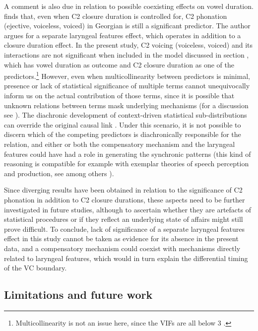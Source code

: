 \documentclass[charis]{glossa}
\begin{document}
A comment is also due in relation to possible coexisting effects on
vowel duration. \citet{begus2017} finds that, even when C2 closure
duration is controlled for, C2 phonation (ejective, voiceless, voiced)
in Georgian is still a significant predictor. The author argues for a
separate laryngeal features effect, which operates in addition to a
closure duration effect. In the present study, C2 voicing (voiceless,
voiced) and its interactions are not significant when included in the
model discussed in section , which has vowel duration
as outcome and C2 closure duration as one of the
predictors.\footnote{Multicollinearity is not an issue here, since the VIFs are all below 3 \citep{zuur2010}.}
However, even when multicollinearity between predictors is minimal,
presence or lack of statistical significance of multiple terms cannot
unequivocally inform us on the actual contribution of those terms, since
it is possible that unknown relations between terms mask underlying
mechanisms (for a discussion see \citealt{mcelreath2015}). The
diachronic development of context-driven statistical sub-distributions
can override the original causal link \citep{soskuthy2013}. Under this
scenario, it is not possible to discern which of the competing
predictors is diachronically responsible for the relation, and either or
both the compensatory mechanism and the laryngeal features could have
had a role in generating the synchronic patterns (this kind of reasoning
is compatible for example with exemplar theories of speech perception
and production, see among others
\citealt{johnson1997, ambridge2018, soskuthy2018, todd2019}).

Since diverging results have been obtained in relation to the
significance of C2 phonation in addition to C2 closure durations, these
aspects need to be further investigated in future studies, although to
ascertain whether they are artefacts of statistical procedures or if
they reflect an underlying state of affairs might still prove difficult.
To conclude, lack of significance of a separate laryngeal features
effect in this study cannot be taken as evidence for its absence in the
present data, and a compensatory mechanism could coexist with mechanisms
directly related to laryngeal features, which would in turn explain the
differential timing of the VC boundary.

\hypertarget{limitations-and-future-work}{%
\subsection{Limitations and future
work}\label{limitations-and-future-work}}
\end{document}
